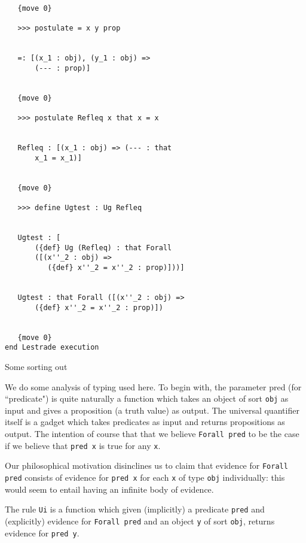 \documentclass{slides}
\begin{document}
\begin{slide}
{\begin{verbatim}
   {move 0}

   >>> postulate = x y prop


   =: [(x_1 : obj), (y_1 : obj) => 
       (--- : prop)]


   {move 0}

   >>> postulate Refleq x that x = x


   Refleq : [(x_1 : obj) => (--- : that 
       x_1 = x_1)]


   {move 0}

   >>> define Ugtest : Ug Refleq


   Ugtest : [
       ({def} Ug (Refleq) : that Forall 
       ([(x''_2 : obj) => 
          ({def} x''_2 = x''_2 : prop)]))]


   Ugtest : that Forall ([(x''_2 : obj) => 
       ({def} x''_2 = x''_2 : prop)])


   {move 0}
end Lestrade execution

\end{verbatim}

}


\end{slide}

\begin{slide}

{\Large Some sorting out}

We do some analysis of typing used here.
To begin with, the parameter pred (for ``predicate") is quite naturally a function which takes
an object of sort {\tt obj} as input and gives a
proposition (a truth value) as output.
The universal quantifier itself is a gadget which
takes predicates as input and returns propositions as output. The intention of course that
that we believe {\tt Forall pred} to be the case if
we believe that {\tt  pred x} is true for any {\tt x}.

\end{slide}

\begin{slide}

Our philosophical motivation disinclines us to
claim that evidence for {\tt Forall pred} consists of
evidence for {\tt pred x} for each {\tt x} of type {\tt obj} individually: this would seem to entail having an
infinite body of evidence.

The rule {\tt Ui} is a function which given (implicitly) a predicate {\tt pred} and (explicitly) evidence
for {\tt Forall pred}  and an object {\tt y} of sort {\tt obj},
returns evidence for {\tt  pred y}.

\end{slide}
\end{document}
